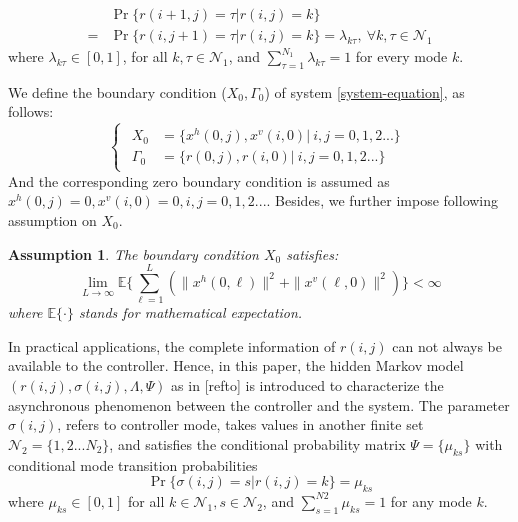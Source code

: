 \documentclass[conference]{IEEEtran}
\newtheorem{assumption}{Assumption}
\begin{document}
	\begin{equation}
		\begin{split}
			&\Pr\{r(i+1,j)=\tau|r(i,j)=k\}\\
		    =&\Pr\{r(i,j+1)=\tau|r(i,j)=k\}=\lambda_{k\tau},\  \forall k,\tau \in \mathcal{N}_{1}
		\end{split}
	\end{equation}
	where $\lambda_{k\tau}\in[0,1]$, for all $k, \tau\in\mathcal{N}_{1}$, and $\sum_{\tau=1}^{N_1}\lambda_{k\tau}=1$ for every mode $k$.
	
	We define the boundary condition ($X_{0},\Gamma_{0}$) of system \eqref{system-equation}, as follows:
	\begin{equation} \label{boundary-condition}
	\left\{
		\begin{array}{lr}
			\begin{split}
				X_{0} &= \{x^{h}(0,j),x^{v}(i,0)|\ i,j = 0,1,2...\}\\
				\varGamma_{0} &= \{r(0,j), r(i,0)|\ i,j = 0,1,2... \}
			\end{split}
		\end{array}
	\right.
	\end{equation}
	And the corresponding zero boundary condition is assumed as $x^{h}(0,j) =0, x^{v}(i,0)=0, i,j =0,1,2...$. Besides, we further impose following assumption on $X_{0}$.
	
	\begin{assumption}\label{boundary-assumptin}
	 	The boundary condition $X_{0}$ satisfies:
	 	\begin{equation}
	 		\lim\limits_{L\to\infty}\mathbb{E}\Big\{\sum_{\ell=1}^{L}(\|x^{h}(0,\ell)\|^{2}+ \|x^{v}(\ell,0)\|^{2})\Big\} < \infty
	 	\end{equation}
	 	where $\mathbb{E}\{\cdot\}$ stands for mathematical expectation.
	\end{assumption}
	
	In practical applications, the complete information of $r(i,j)$ can not always be available to the controller. Hence, in this paper, the hidden Markov model $(r(i,j),\sigma(i,j),\varLambda,\varPsi)$ as in [refto] is introduced to characterize the asynchronous phenomenon between the controller and the system. The parameter $\sigma(i,j)$, refers to controller mode, takes values in another finite set $\mathcal{N}_{2} = \{1,2...N_{2}\}$, and satisfies the conditional probability matrix $\varPsi=\{\mu_{ks}\}$ with conditional mode transition probabilities
	\begin{equation}
		\Pr\{\sigma(i,j)=s|r(i,j)=k\}=\mu_{ks} %
	\end{equation}
	where $\mu_{ks}\in[0,1]$ for all $k\in\mathcal{N}_{1}, s\in\mathcal{N}_{2}$, and $\sum_{s=1}^{N2}\mu_{ks} = 1$ for any mode $k$.
	
\end{document}
